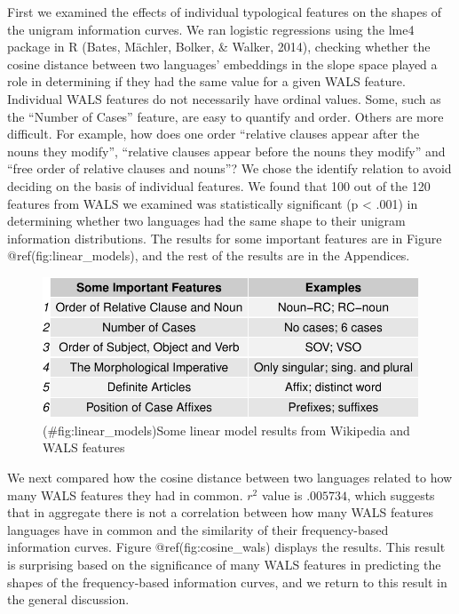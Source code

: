 \documentclass[11pt,]{article}
\begin{document}
First we examined the effects of individual typological features on the shapes of the unigram information curves. We ran logistic regressions using the lme4 package in R (Bates, Mächler, Bolker, \& Walker, 2014), checking whether the cosine distance between two languages' embeddings in the slope space played a role in determining if they had the same value for a given WALS feature. Individual WALS features do not necessarily have ordinal values. Some, such as the ``Number of Cases'' feature, are easy to quantify and order. Others are more difficult. For example, how does one order ``relative clauses appear after the nouns they modify'', ``relative clauses appear before the nouns they modify'' and ``free order of relative clauses and nouns''? We chose the identify relation to avoid deciding on the basis of individual features. We found that 100 out of the 120 features from WALS we examined was statistically significant (p \textless{} .001) in determining whether two languages had the same shape to their unigram information distributions. The results for some important features are in Figure @ref(fig:linear\_models), and the rest of the results are in the Appendices.

\begin{figure}
\centering
\includegraphics{paper_files/figure-latex/linear_models-1.pdf}
\caption{(\#fig:linear\_models)Some linear model results from Wikipedia and WALS features}
\end{figure}

We next compared how the cosine distance between two languages related to how many WALS features they had in common. \(r^2\) value is \(.005734\), which suggests that in aggregate there is not a correlation between how many WALS features languages have in common and the similarity of their frequency-based information curves. Figure @ref(fig:cosine\_wals) displays the results. This result is surprising based on the significance of many WALS features in predicting the shapes of the frequency-based information curves, and we return to this result in the general discussion.
\end{document}
